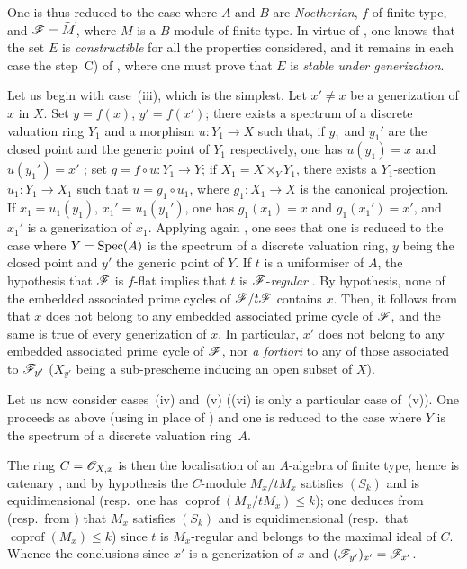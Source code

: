 One is thus reduced to the case where $A$ and $B$ are \emph{Noetherian}, $f$ of finite type, and $\mathscr{F}=\widetilde{M}$, where $M$ is a $B$-module of finite type.
In virtue of , one knows that the set $E$ is \emph{constructible} for all the properties considered, and it remains in each case the step~C) of , where one must prove that $E$ is \emph{stable under generization}.

\begin{env}[12.1.1.1]
\label{IV.12.1.1.1}
Let us begin with case~(iii), which is the simplest.
Let $x'\neq x$ be a generization of $x$ in $X$.
Set $y=f(x)$, $y'=f(x')$; there exists a spectrum of a discrete valuation ring $Y_1$ and a morphism $u:Y_1\to X$ such that, if $y_1$ and $y_1'$ are the closed point and the generic point of $Y_1$ respectively, one has $u(y_1)=x$ and $u(y_1')=x'$ ; set $g=f\circ u:Y_1\to Y$; if $X_1=X\times_Y Y_1$, there exists a $Y_1$-section $u_1:Y_1\to X_1$ such that $u=g_1\circ u_1$, where $g_1:X_1\to X$ is the canonical projection.
If $x_1=u_1(y_1)$, $x_1'=u_1(y_1')$, one has $g_1(x_1)=x$ and $g_1(x_1')=x'$, and $x_1'$ is a generization of $x_1$.
Applying again , one sees
that one is reduced to the case where $Y=\operatorname{Spec}(A)$ is the spectrum of a discrete valuation ring, $y$ being the closed point and $y'$ the generic point of $Y$.
If $t$ is a uniformiser of $A$, the hypothesis that $\mathscr{F}$ is $f$-flat implies that $t$ is $\mathscr{F}$-\emph{regular} .
By hypothesis, none of the embedded associated prime cycles of $\mathscr{F}/t\mathscr{F}$ contains $x$.
Then, it follows from  that $x$ does not belong to any embedded associated prime cycle of $\mathscr{F}$, and the same is true of every generization of $x$.
In particular, $x'$ does not belong to any embedded associated prime cycle of $\mathscr{F}$, nor \emph{a fortiori} to any of those associated to $\mathscr{F}_{y'}$ ($X_{y'}$ being a sub-prescheme inducing an open subset of $X$).
\end{env}

\begin{env}[12.1.1.2]
\label{IV.12.1.1.2}
Let us now consider cases~(iv) and~(v) ((vi) is only a particular case of~(v)).
One proceeds as above (using  in place of ) and one is reduced to the case where $Y$ is the spectrum of a discrete valuation ring~$A$.

The ring $C=\mathscr{O}_{X,x}$ is then the localisation of an $A$-algebra of finite type, hence is catenary , and by hypothesis the $C$-module $M_x/tM_x$ satisfies $(S_k)$ and is equidimensional (resp.\ one has $\operatorname{coprof}(M_x/tM_x)\leqslant k$); one deduces from  (resp.\ from ) that $M_x$ satisfies $(S_k)$ and is equidimensional (resp.\ that $\operatorname{coprof}(M_x)\leqslant k$) since $t$ is $M_x$-regular and belongs to the maximal ideal of $C$.
Whence the conclusions since $x'$ is a generization of $x$ and $(\mathscr{F}_{y'})_{x'}=\mathscr{F}_{x'}$.
\end{env}

